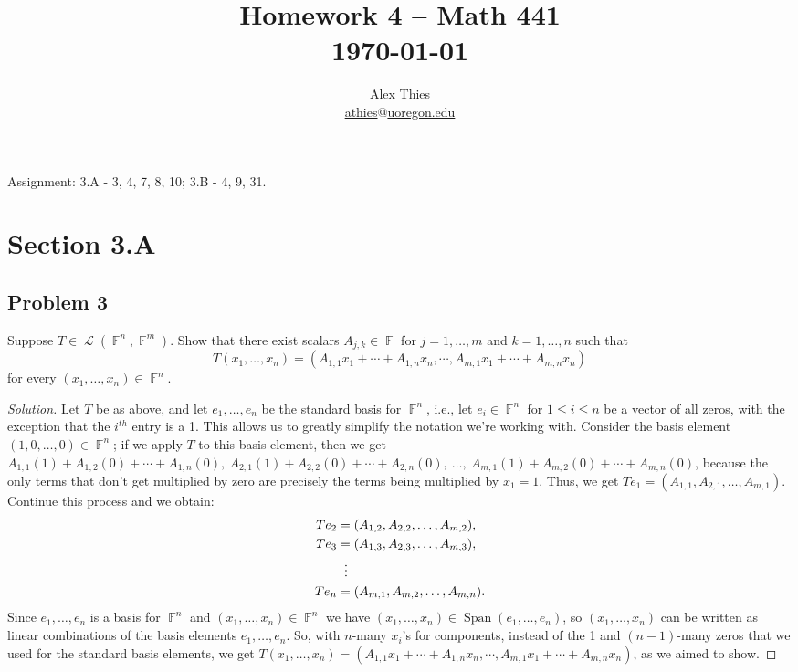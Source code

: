 \documentclass[letterpaper, 12pt]{amsart}
\DeclareMathOperator{\F}{\mathbb{F}}
\DeclareMathOperator{\Ell}{\mathscr{L}}
\theoremstyle{definition}  %
\DeclareMathOperator{\Span}{Span}
\begin{document}
	\title{Homework 4  -- Math 441 \\ \today}
	\author{Alex Thies \\ \href{mailto:athies@uoregon.edu}{\lowercase{athies$@$uoregon.edu}}}

	\maketitle

	Assignment: 3.A - 3, 4, 7, 8, 10; 3.B - 4, 9, 31.

	\section*{Section 3.A}
		\subsection*{Problem 3}
		Suppose $T \in \Ell (\F^{n}, \F^{m})$.
		Show that there exist scalars $A_{j,k} \in \F$ for $j = 1, \dots, m$ and $k = 1, \dots, n$ such that $$T(x_{1}, \dots, x_{n}) = (A_{1,1} x_{1} + \cdots + A_{1,n}x_{n}, \cdots, A_{m,1}x_{1} + \cdots + A_{m,n}x_{n})$$ for every $(x_{1}, \dots, x_{n}) \in \F^{n}$.

		\begin{proof}[Solution]
		Let $T$ be as above, and let $e_{1}, \dots, e_{n}$ be the standard basis for $\F^{n}$, i.e., let $e_{i} \in \F^{n}$ for $1 \leq i \leq n$ be a vector of all zeros, with the exception that the $i^{th}$ entry is a 1.
		This allows us to greatly simplify the notation we're working with.
		Consider the basis element $(1,0, \dots, 0) \in \F^{n}$; if we apply $T$ to this basis element, then  we get $A_{1,1} (1) + A_{1,2} (0) + \cdots + A_{1,n}(0), \ A_{2,1} (1) + A_{2,2} (0) + \cdots + A_{2,n}(0), \ \dots, \ A_{m,1} (1) + A_{m,2} (0) + \cdots + A_{m,n}(0)$, because the only terms that don't get multiplied by zero are precisely the terms being multiplied by $x_{1} = 1$.
		Thus, we get $Te_{1} = (A_{1,1}, A_{2,1}, \dots, A_{m,1})$.
		Continue this process and we obtain:
			\begin{align*}
				Te_{2} &= (A_{1,2}, A_{2,2}, \dots, A_{m,2}), \\
				Te_{3} &= (A_{1,3}, A_{2,3}, \dots, A_{m,3}), \\
				& \hspace{2mm} \vdots \\
				Te_{n} &= (A_{m,1}, A_{m,2}, \dots, A_{m,n}).
			\end{align*}
		Since $e_{1}, \dots, e_{n}$ is a basis for $\F^{n}$ and $(x_{1}, \dots, x_{n}) \in \F^{n}$ we have $(x_{1}, \dots, x_{n}) \in \Span(e_{1}, \dots, e_{n})$, so $(x_{1}, \dots, x_{n})$ can be written as linear combinations of the basis elements $e_{1}, \dots, e_{n}$.
		So, with $n$-many $x_{i}$'s for components, instead of the 1 and $(n-1)$-many zeros that we used for the standard basis elements, we get $T(x_{1}, \dots, x_{n}) = (A_{1,1} x_{1} + \cdots + A_{1,n}x_{n}, \cdots, A_{m,1}x_{1} + \cdots + A_{m,n}x_{n})$, as we aimed to show.
		\end{proof}
\end{document}
